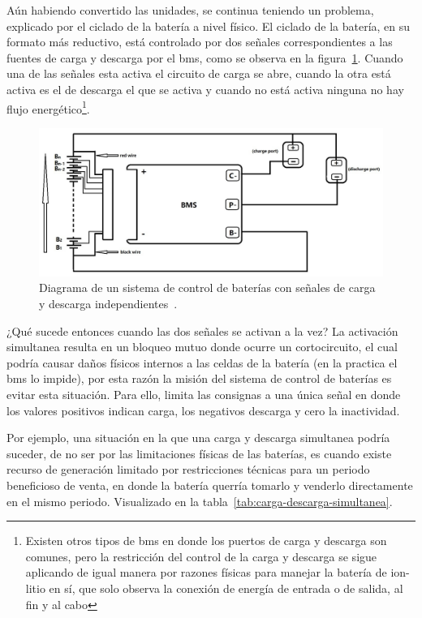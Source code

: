 Aún habiendo convertido las unidades, se continua teniendo un problema, explicado por el ciclado de la batería a nivel físico. El ciclado de la batería, en su formato más reductivo, está controlado por dos señales correspondientes a las fuentes de carga y descarga por el \gls{bms}, como se observa en la figura~\ref{fig:carga-descarga}. Cuando una de las señales esta activa el circuito de carga se abre, cuando la otra está activa es el de descarga el que se activa y cuando no está activa ninguna no hay flujo energético\footnote{Existen otros tipos de \gls{bms} en donde los puertos de carga y descarga son comunes, pero la restricción del control de la carga y descarga se sigue aplicando de igual manera por razones físicas para manejar la batería de ion-litio en sí, que solo observa la conexión de energía de entrada o de salida, al fin y al cabo}.

\begin{figure}
  \centering
  \includegraphics[width=0.5\linewidth]{figures/carga-descarga.png}
  \caption{Diagrama de un sistema de control de baterías con señales de carga y descarga independientes~\cite{sunkko2025two}.}
  \label{fig:carga-descarga}
\end{figure}

¿Qué sucede entonces cuando las dos señales se activan a la vez? La activación simultanea resulta en un bloqueo mutuo donde ocurre un cortocircuito, el cual podría causar daños físicos internos a las celdas de la batería (en la practica el \gls{bms} lo impide), por esta razón la misión del sistema de control de baterías es evitar esta situación. Para ello, limita las consignas a una única señal en donde los valores positivos indican carga, los negativos descarga y cero la inactividad.

Por ejemplo, una situación en la que una carga y descarga simultanea podría suceder, de no ser por las limitaciones físicas de las baterías, es cuando existe recurso de generación limitado por restricciones técnicas para un periodo beneficioso de venta, en donde la batería querría tomarlo y venderlo directamente en el mismo periodo. Visualizado en la tabla~\ref{tab:carga-descarga-simultanea}.

